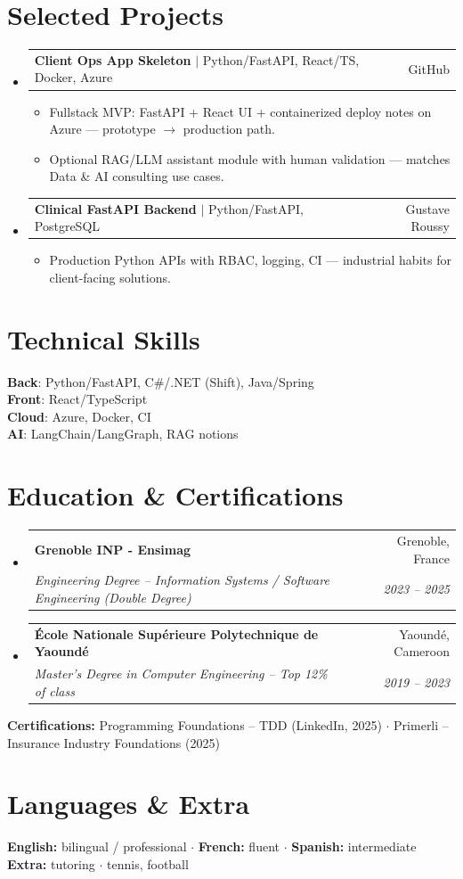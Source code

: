 \documentclass[letterpaper,10.5pt]{article}
\makeatletter
\newcommand{\resumeItem}[1]{\item\small{#1 \vspace{-1.5pt}}}
\newcommand{\resumeSubheading}[4]{\vspace{-1pt}\item\begin{tabular*}{0.97\textwidth}[t]{l@{\extracolsep{\fill}}r}\textbf{#1} & #2 \\\textit{\small#3} & \textit{\small #4} \\\end{tabular*}\vspace{-5pt}}
\newcommand{\resumeProjectHeading}[2]{\item\begin{tabular*}{0.97\textwidth}{l@{\extracolsep{\fill}}r}\small#1 & #2 \\\end{tabular*}\vspace{-5pt}}
\newcommand{\resumeSubHeadingListStart}{\begin{itemize}[leftmargin=0.15in, label={}]}
\newcommand{\resumeSubHeadingListEnd}{\end{itemize}}
\newcommand{\resumeItemListStart}{\begin{itemize}[leftmargin=0.18in]}
\newcommand{\resumeItemListEnd}{\end{itemize}\vspace{-3pt}}
\makeatother
\begin{document}
\section{Selected Projects}
\resumeSubHeadingListStart
  \resumeProjectHeading{\textbf{Client Ops App Skeleton} $|$ Python/FastAPI, React/TS, Docker, Azure}{GitHub}
    \resumeItemListStart
      \resumeItem{Fullstack MVP: FastAPI + React UI + containerized deploy notes on Azure --- prototype $\rightarrow$ production path.}
      \resumeItem{Optional RAG/LLM assistant module with human validation --- matches Data \& AI consulting use cases.}
    \resumeItemListEnd
  \resumeProjectHeading{\textbf{Clinical FastAPI Backend} $|$ Python/FastAPI, PostgreSQL}{Gustave Roussy}
    \resumeItemListStart
      \resumeItem{Production Python APIs with RBAC, logging, CI --- industrial habits for client-facing solutions.}
    \resumeItemListEnd
\resumeSubHeadingListEnd
\section{Technical Skills}
\begin{itemize}[leftmargin=0.15in, label={}]\small{\item{\textbf{Back}: Python/FastAPI, C\#/.NET (Shift), Java/Spring \\ \textbf{Front}: React/TypeScript \\ \textbf{Cloud}: Azure, Docker, CI \\ \textbf{AI}: LangChain/LangGraph, RAG notions}}\end{itemize}
\section{Education \& Certifications}
\resumeSubHeadingListStart
  \resumeSubheading{Grenoble INP - Ensimag}{Grenoble, France}{Engineering Degree -- Information Systems / Software Engineering (Double Degree)}{2023 -- 2025}
  \resumeSubheading{\'Ecole Nationale Sup\'erieure Polytechnique de Yaound\'e}{Yaound\'e, Cameroon}{Master's Degree in Computer Engineering -- Top 12\% of class}{2019 -- 2023}
\resumeSubHeadingListEnd
\small{\textbf{Certifications:} Programming Foundations -- TDD (LinkedIn, 2025) $\cdot$ Primerli -- Insurance Industry Foundations (2025)}
\section{Languages \& Extra}
\small{\textbf{English:} bilingual / professional $\cdot$ \textbf{French:} fluent $\cdot$ \textbf{Spanish:} intermediate \\ \textbf{Extra:} tutoring $\cdot$ tennis, football}
\end{document}
